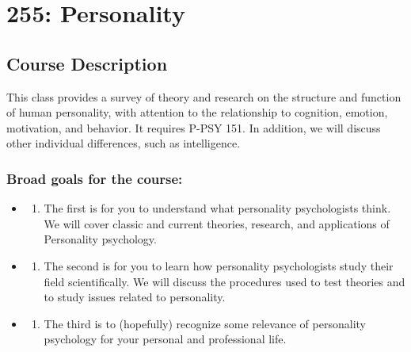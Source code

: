 \documentclass[
]{book}
\providecommand{\tightlist}{%
  \setlength{\itemsep}{0pt}\setlength{\parskip}{0pt}}
\begin{document}
\chapter*{255: Personality}\label{personality}


\section*{Course Description}\label{course-description-1}


This class provides a survey of theory and research on the structure and function of human personality, with attention to the relationship to cognition, emotion, motivation, and behavior. It requires P-PSY 151. In addition, we will discuss other individual differences, such as intelligence.

\subsection*{Broad goals for the course:}\label{broad-goals-for-the-course}


\begin{itemize}
\tightlist
\item
  \begin{enumerate}
  \def\labelenumi{\arabic{enumi}.}
  \tightlist
  \item
    The first is for you to understand what personality psychologists think. We will cover classic and current theories, research, and applications of Personality psychology.
  \end{enumerate}
\item
  \begin{enumerate}
  \def\labelenumi{\arabic{enumi}.}
  \setcounter{enumi}{1}
  \tightlist
  \item
    The second is for you to learn how personality psychologists study their field scientifically. We will discuss the procedures used to test theories and to study issues related to personality.
  \end{enumerate}
\item
  \begin{enumerate}
  \def\labelenumi{\arabic{enumi}.}
  \setcounter{enumi}{2}
  \tightlist
  \item
    The third is to (hopefully) recognize some relevance of personality psychology for your personal and professional life.
  \end{enumerate}
\end{itemize}
\end{document}
